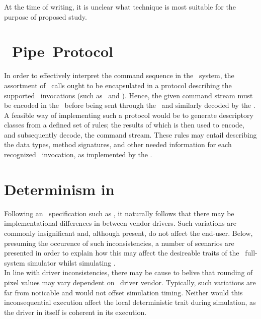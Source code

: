 At the time of writing, it is unclear what technique is most suitable for the purpose of proposed study.

\section*{\termsimics ~Pipe~Protocol}
\label{sec:appendixa_simicspipeprotocol}

In order to effectively interpret the command sequence in the \termhost\ system, the assortment of \termapi\ calls ought to be encapsulated in a protocol describing the supported \termapi\ invocations (such as \termopengles\ and \termegl ).
Hence, the given command stream must be encoded in the \termguestsystemlibraries\ before being sent through the \termsimicspipe\ and similarly decoded by the \termhostrasterizationprocess .
A feasible way of implementing such a protocol would be to generate descriptory classes from a defined set of rules; the results of which is then used to encode, and subsequently decode, the command stream.
These rules may entail describing the data types, method signatures, and other needed information for each recognized \termapi\ invocation, as implemented by the \termrefsolu .

\section*{Determinism in \termopengles }
\label{sec:appendixa_determinisminopengles}

Following an \termapi\ specification such as \termopengles , it naturally follows that there may be implementational differences in-between vendor drivers.
Such variations are commonly insignificant and, although present, do not affect the end-user.
Below, presuming the occurence of such inconsistencies, a number of scenarios are presented in order to explain how this may affect the desireable traits of the \termsimics\ full-system simulator whilst simulating \termopengles .\\

\noindent
In line with driver inconsistencies, there may be cause to belive that rounding of pixel values may vary dependent on \termhost\ driver vendor.
Typically, such variations are far from noticable and would not offset simulation timing.
Neither would this inconsequential execution affect the local deterministic trait during simulation, as the driver in itself is coherent in its execution.

